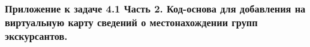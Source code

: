 \subsubsection*{Приложение к задаче 4.1 Часть 2. Код-основа для добавления на виртуальную карту сведений о местонахождении групп экскурсантов.}

\inputminted[fontsize=\footnotesize, linenos]{csharp}{final/command_tour/ar/task_05/source.cs}